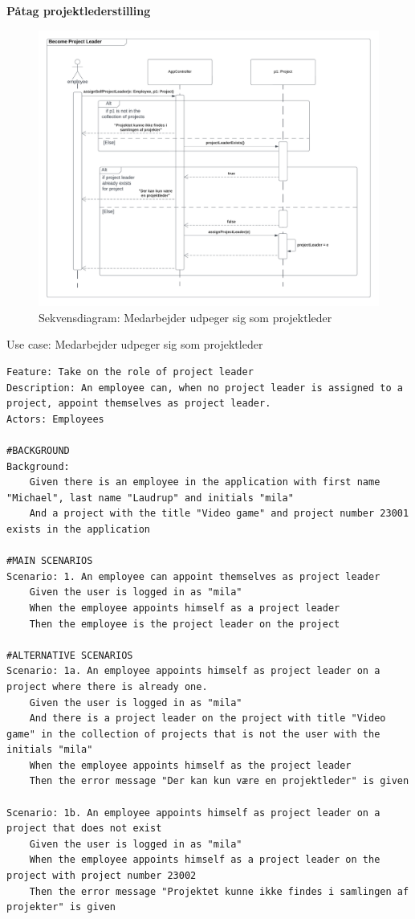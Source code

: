\textbf{Påtag projektlederstilling}
\begin{figure}[H]
    \centering
    \caption{Sekvensdiagram: Medarbejder udpeger sig som projektleder}\label{fig:becomeProjectLeader}
    \includegraphics[width = 1\textwidth]{RequirementsAndDesign/Diagrams/Become Project Leader.png}
\end{figure}
\begin{listing}[H]
    \centering
    \caption{Use case: Medarbejder udpeger sig som projektleder} \label{lst:usecase_bliv_projektleder}
    \begin{verbatim}  
Feature: Take on the role of project leader
Description: An employee can, when no project leader is assigned to a project, appoint themselves as project leader.
Actors: Employees

#BACKGROUND
Background:
    Given there is an employee in the application with first name "Michael", last name "Laudrup" and initials "mila"
    And a project with the title "Video game" and project number 23001 exists in the application

#MAIN SCENARIOS
Scenario: 1. An employee can appoint themselves as project leader
    Given the user is logged in as "mila"
    When the employee appoints himself as a project leader
    Then the employee is the project leader on the project

#ALTERNATIVE SCENARIOS
Scenario: 1a. An employee appoints himself as project leader on a project where there is already one.
    Given the user is logged in as "mila"
    And there is a project leader on the project with title "Video game" in the collection of projects that is not the user with the initials "mila"
    When the employee appoints himself as the project leader
    Then the error message "Der kan kun være en projektleder" is given

Scenario: 1b. An employee appoints himself as project leader on a project that does not exist
    Given the user is logged in as "mila"
    When the employee appoints himself as a project leader on the project with project number 23002
    Then the error message "Projektet kunne ikke findes i samlingen af projekter" is given
    \end{verbatim}
\end{listing}
